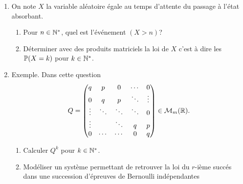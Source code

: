 \begin{enumerate}
  \item On note $X$ la variable aléatoire égale au temps d'attente du passage à l'état absorbant.
  \begin{enumerate}
    \item Pour $n \in \mathbb{N}^*$, quel est l'événement $(X > n)$?
    \item Déterminer avec des produits matriciels la loi de $X$ c'est à dire les $\mathbb{P}(X = k)$ pour $k \in \mathbb{N}^*$.
  \end{enumerate}

  \item Exemple. Dans cette question
\[
  Q = 
  \begin{pmatrix}
    q      & p      & 0      & \cdots & 0      \\
    0      & q      & p      & \ddots & \vdots   \\
    \vdots & \ddots & \ddots & \ddots & 0        \\
    \vdots &        & \ddots &q       & p       \\
    0      & \cdots & \cdots & 0      & q       
  \end{pmatrix}
  \in \mathcal{M}_m(\mathbb{R}).
\]
  \begin{enumerate}
    \item Calculer $Q^k$ pour $k \in \mathbb{N}^*$.
    \item Modéliser un système permettant de retrouver la loi du $r$-ième succés dans une succession d'épreuves de Bernoulli indépendantes
  \end{enumerate}

  
\end{enumerate}


